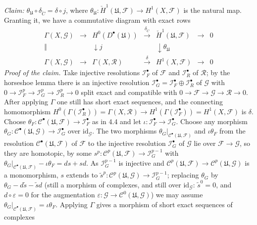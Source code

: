 \documentclass[11pt]{article}
\begin{document}
\emph{Claim: $\theta_{\mathfrak U}\circ\delta_{\check C}=\delta\circ j$}, where $\theta_{\mathfrak U}:\check H^1(\mathfrak U,\mathcal F)\to H^1(X,\mathcal F)$ is the natural map. Granting it, we have a commutative diagram with exact rows
\[
\begin{array}{ccccccc}
\Gamma(X,\mathcal G)&\to&H^0(D^\bullet(\mathfrak U))&\xrightarrow{\delta_{\check C}}&\check H^1(\mathfrak U,\mathcal F)&\to&0\\
\Vert&&\downarrow j&&\downarrow\theta_{\mathfrak U}&&\\
\Gamma(X,\mathcal G)&\to&\Gamma(X,\mathcal R)&\xrightarrow{\ \delta\ }&H^1(X,\mathcal F)&\to&0
\end{array}
\]
\emph{Proof of the claim.} Take injective resolutions $\mathcal I_F^\bullet$ of $\mathcal F$ and $\mathcal I_R^\bullet$ of $\mathcal R$; by the horseshoe lemma there is an injective resolution $\mathcal I_G^\bullet=\mathcal I_F^\bullet\oplus\mathcal I_R^\bullet$ of $\mathcal G$ with $0\to\mathcal I_F^p\to\mathcal I_G^p\to\mathcal I_R^p\to0$ split exact and compatible with $0\to\mathcal F\to\mathcal G\to\mathcal R\to0$. After applying $\Gamma$ one still has short exact sequences, and the connecting homomorphism $H^0(\Gamma(\mathcal I_R^\bullet))=\Gamma(X,\mathcal R)\to H^1(\Gamma(\mathcal I_F^\bullet))=H^1(X,\mathcal F)$ is $\delta$. Choose $\theta_F:\mathcal C^\bullet(\mathfrak U,\mathcal F)\to\mathcal I_F^\bullet$ as in 4.4 and let $\iota:\mathcal I_F^\bullet\to\mathcal I_G^\bullet$. Choose any morphism $\theta_G:\mathcal C^\bullet(\mathfrak U,\mathcal G)\to\mathcal I_G^\bullet$ over $\mathrm{id}_{\mathcal G}$. The two morphisms $\theta_G|_{\mathcal C^\bullet(\mathfrak U,\mathcal F)}$ and $\iota\theta_F$ from the resolution $\mathcal C^\bullet(\mathfrak U,\mathcal F)$ of $\mathcal F$ to the injective resolution $\mathcal I_G^\bullet$ of $\mathcal G$ lie over $\mathcal F\to\mathcal G$, so they are homotopic, by some $s^p:\mathcal C^p(\mathfrak U,\mathcal F)\to\mathcal I_G^{p-1}$ with $\theta_G|_{\mathcal C^\bullet(\mathfrak U,\mathcal F)}-\iota\theta_F=ds+sd$. As $\mathcal I_G^{p-1}$ is injective and $\mathcal C^p(\mathfrak U,\mathcal F)\to\mathcal C^p(\mathfrak U,\mathcal G)$ is a monomorphism, $s$ extends to $\tilde s^p:\mathcal C^p(\mathfrak U,\mathcal G)\to\mathcal I_G^{p-1}$; replacing $\theta_G$ by $\theta_G-d\tilde s-\tilde sd$ (still a morphism of complexes, and still over $\mathrm{id}_{\mathcal G}$: $\tilde s^0=0$, and $d\circ\varepsilon=0$ for the augmentation $\varepsilon:\mathcal G\to\mathcal C^0(\mathfrak U,\mathcal G)$) we may assume $\theta_G|_{\mathcal C^\bullet(\mathfrak U,\mathcal F)}=\iota\theta_F$. Applying $\Gamma$ gives a morphism of short exact sequences of complexes
\end{document}
